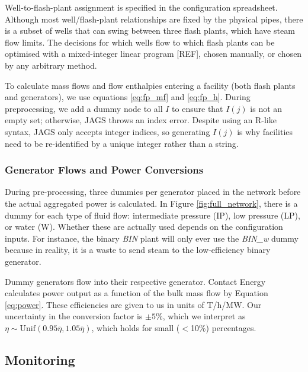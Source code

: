 \documentclass[a4paper, 12pt]{article}
\begin{document}
\begin{figure}
\begin{minipage}[t]{.48\textwidth}
  \label{fig:production_curve}
\end{minipage}
\end{figure}

Well-to-flash-plant assignment is specified in the configuration spreadsheet. Although most well/flash-plant relationships are fixed by the physical pipes, there is a subset of wells that can swing between three flash plants, which have steam flow limits. The decisions for which wells flow to which flash plants can be optimised with a mixed-integer linear program [REF], chosen manually, or chosen by any arbitrary method.

To calculate mass flows and flow enthalpies entering a facility (both flash plants and generators), we use equations \ref{eq:fp_mf} and \ref{eq:fp_h}. During preprocessing, we add a dummy node to all $I$ to ensure that $I(j)$ is not an empty set; otherwise, JAGS throws an index error. Despite using an R-like syntax, JAGS only accepts integer indices, so generating $I(j)$ is why facilities need to be re-identified by a unique integer rather than a string. 

\subsubsection{Generator Flows and Power Conversions}
During pre-processing, three dummies per generator placed in the network before the actual aggregated power is calculated. In Figure \ref{fig:full_network}, there is a dummy for each type of fluid flow: intermediate pressure (IP), low pressure (LP), or water (W). Whether these are actually used depends on the configuration inputs. For instance, the binary \emph{BIN} plant will only ever use the \emph{BIN\_w} dummy because in reality, it is a waste to send steam to the low-efficiency binary generator.

Dummy generators flow into their respective generator. Contact Energy calculates power output as a function of the bulk mass flow by Equation \ref{eq:power}. These efficiencies are given to us in units of T/h/MW. Our uncertainty in the conversion factor is $\pm5\%$, which we interpret as $\eta \sim \text{Unif}\left( 0.95\overline\eta, 1.05\overline\eta \right)$, which holds for small ($<$10\%) percentages.

\subsection{Monitoring}
\end{document}
